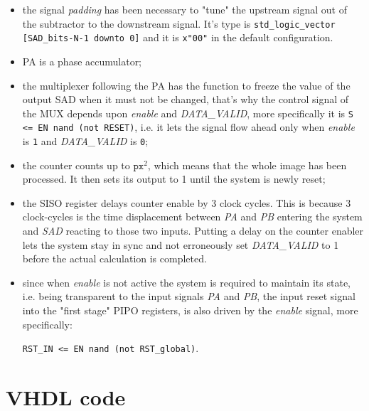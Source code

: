 \documentclass[12pt, a4paper]{article}
\begin{document}
\begin{itemize} 


\item the signal \textit{padding} has been necessary to "tune" the upstream signal out of the subtractor to the downstream signal. It's type is \texttt{std\_logic\_vector [SAD\_bits-N-1 downto 0]} and it is \texttt{x"00"} in the default configuration.

\item PA is a phase accumulator;

\item the multiplexer following the PA has the function to freeze the value of the output SAD when it must not be changed, that's why the control signal of the MUX depends upon \textit{enable} and \textit{DATA\_VALID}, more specifically it is
 \texttt{S <= EN nand (not RESET)}, i.e. it lets the signal flow ahead only when \textit{enable} is \texttt{1} and \textit{DATA\_VALID} is \texttt{0};
 
 \item the counter counts up to $\texttt{px}^2$, which means that the whole image has been processed. It then sets its output to 1 until the system is newly reset;
 
 \item the SISO register delays counter enable by 3 clock cycles. This is because 3 clock-cycles is the time displacement between \textit{PA} and \textit{PB} entering the system and \textit{SAD} reacting to those two inputs. 
 Putting a delay on the counter enabler lets the system stay in sync and not erroneously set \textit{DATA\_VALID} to 1 before the actual calculation is completed.
 
 \item since when \textit{enable} is not active the system is required to maintain its state, i.e. being transparent to the input signals \textit{PA} and \textit{PB}, the input reset signal into the "first stage" PIPO registers, is also driven by the \textit{enable} signal, more specifically:

 \texttt{RST\_IN <= EN nand (not RST\_global)}.
 
 

\end{itemize}



\section{VHDL code}
\end{document}
